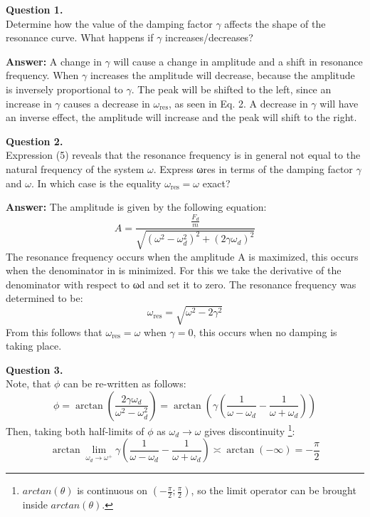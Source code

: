 \textbf{Question 1.} \\
Determine how the value of the damping factor $\gamma$ affects the shape of the resonance curve. What happens if $\gamma$ increases/decreases?

\textbf{Answer:} A change in $\gamma$ will cause a change in amplitude and a shift in resonance frequency. When $\gamma$ increases the amplitude will decrease, because the amplitude is inversely proportional to $\gamma$. The peak will be shifted to the left, since an increase in $\gamma$ causes a decrease in $\omega_{\text{res}}$, as seen in Eq. 2. A decrease in $\gamma$ will have an inverse effect, the amplitude will increase and the peak will shift to the right.

\vspace{1em}

\textbf{Question 2.} \\
Expression (5) reveals that the resonance frequency is in general not equal to the natural frequency of the system $\omega$. Express ωres in terms of the damping factor $\gamma$ and $\omega$. In which case is the equality $\omega_{\text{res}} = \omega$ exact?

\textbf{Answer:} The amplitude is given by the following equation:
\begin{equation}
        A = \frac{\frac{F_d}{m}}{\sqrt{(\omega^2 - \omega_d^2)^2 + (2\gamma\omega_d)^2}}
\end{equation}
The resonance frequency occurs when the amplitude A is maximized, this occurs when the denominator in is minimized. For this we take the derivative of the denominator with respect to ωd and set it to zero. The resonance frequency was determined to be: 
\begin{equation}
        \omega_{\text{res}} = \sqrt{\omega^2 - 2\gamma^2}
\end{equation}
From this follows that $\omega_{\text{res}} = \omega$ when $\gamma = 0$, this occurs when no damping is taking place.

\vspace{1em}

\textbf{Question 3.} \\

Note, that $\phi$ can be re-written as follows:
\begin{equation*}
        \phi = \arctan(\frac{2\gamma\omega_d}{\omega^2 - \omega_d^2}) = \arctan(\gamma ( \frac{1}{\omega-\omega_d} - \frac{1}{\omega+\omega_d} ))
\end{equation*}
Then, taking both half-limits of $\phi$ as $\omega_d \rightarrow \omega$ gives discontinuity \footnote{$arctan(\theta)$ is continuous on $(-\frac{\pi}{2};\frac{\pi}{2})$, so the limit operator can be brought inside $arctan(\theta)$.}:
\begin{equation*}
        \arctan \lim_{\omega_d \rightarrow \omega^+} {\gamma ( \frac{1}{\omega-\omega_d} - \frac{1}{\omega+\omega_d} )} \asymp \arctan( -\infty) = -\frac{\pi}{2}
\end{equation*}

